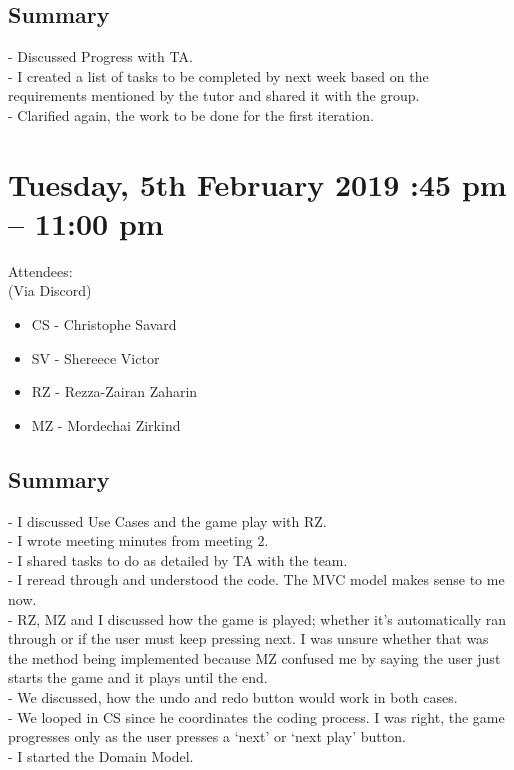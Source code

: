 \documentclass[12pt]{article}
\begin{document}
\subsection{Summary}
-	Discussed Progress with TA.\\
-	I created a list of tasks to be completed by next week based on the requirements mentioned by the tutor and shared it with the group.\\
-	Clarified again, the work to be done for the first iteration.\\ 


\section{Tuesday, 5th February 2019 :45 pm – 11:00 pm }

Attendees:\\ 
(Via Discord) \\
\begin{itemize}
	\item CS - Christophe Savard
	\item SV - Shereece Victor
	\item RZ - Rezza-Zairan Zaharin
	\item MZ - Mordechai Zirkind
\end{itemize}


\subsection{Summary}
-	I discussed Use Cases and the game play with RZ.\\ 
-	I wrote meeting minutes from meeting 2. \\
-	I shared tasks to do as detailed by TA with the team. \\
-	I reread through and understood the code. The MVC model makes sense to me now. \\
-	RZ, MZ and I discussed how the game is played; whether it’s automatically ran through or if the user must keep pressing next. I was unsure whether that was the method being implemented because MZ confused me by saying the user just starts the game and it plays until the end. \\
-	We discussed, how the undo and redo button would work in both cases.  \\
-	We looped in CS since he coordinates the coding process. I was right, the game progresses only as the user presses a ‘next’ or ‘next play’ button. \\
-	I started the Domain Model. \\
\end{document}
